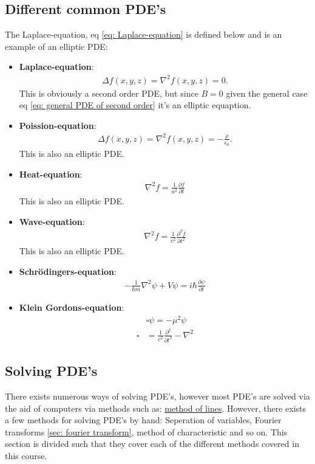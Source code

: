 \documentclass[12pt]{article}
\begin{document}
\subsection{Different common PDE's}
The Laplace-equation, eq \eqref{eq: Laplace-equation} is defined below and is an example of an elliptic PDE:
\begin{itemize}
    \item \textbf{Laplace-equation}: \begin{align}
    \Delta f(x,y,z) = \nabla^2 f(x,y,z) = 0.\label{eq: Laplace-equation}
\end{align}This is obviously a second order PDE, but since $B = 0$ given the general case eq \eqref{eq: general PDE of second order} it's an elliptic equaption.
    \item \textbf{Poission-equation}: \begin{align}\Delta f(x,y,z) = \nabla^2 f(x,y,z) = -\frac{\rho}{\epsilon_0}.\label{eq: Poission-equation}\end{align}This is also an elliptic PDE.
    \item \textbf{Heat-equation}: \begin{align*}\nabla^2f = \frac{1}{a^2}\frac{\partial f}{\partial t}\end{align*}This is also an elliptic PDE.
    \item \textbf{Wave-equation}:\begin{align*}
    \nabla^2f = \frac{1}{c^2}\frac{\partial^2 f}{\partial t^2}
\end{align*}This is also an elliptic PDE.
    \item \textbf{Schrödingers-equation}:\begin{align*}
    -\frac{1}{\hbar m}\nabla^2 \psi+ V\psi = i\hbar\frac{\partial \psi}{\partial t}
\end{align*}
    \item \textbf{Klein Gordons-equation}: \begin{align*}
    &\square\psi = -\mu^2\psi\\
    \square &= \frac{1}{c^2}\frac{\partial^2}{\partial t^2} - \nabla^2
\end{align*}
\end{itemize}
\subsection{Solving PDE's}
There exists numerous ways of solving PDE's, however most PDE's are solved via the aid of computers via methods such as: \underline{method of lines}. However, there exists a few methods for solving PDE's by hand: Seperation of variables, Fourier transforms \ref{sec: fourier transform}, 
method of characteristic and so on. This section is divided such that they cover each of the different methods covered in this course.
\end{document}
